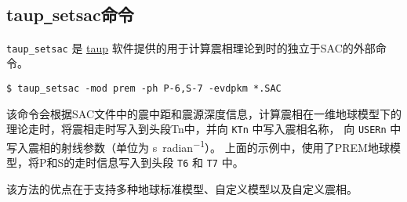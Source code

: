 \subsection{taup\texttt{\_}setsac命令}
\verb|taup_setsac| 是 \href{http://www.seis.sc.edu/taup/}{taup}
软件提供的用于计算震相理论到时的独立于SAC的外部命令。
\begin{verbatim}
$ taup_setsac -mod prem -ph P-6,S-7 -evdpkm *.SAC
\end{verbatim}
该命令会根据SAC文件中的震中距和震源深度信息，计算震相在一维地球模型下的
理论走时，将震相走时写入到头段Tn中，并向 \texttt{KTn} 中写入震相名称，
向 \texttt{USERn} 中写入震相的射线参数（单位为 \si{\s\per radian}）。
上面的示例中，使用了PREM地球模型，将P和S的走时信息写入到头段 \texttt{T6}
和 \texttt{T7} 中。

该方法的优点在于支持多种地球标准模型、自定义模型以及自定义震相。
